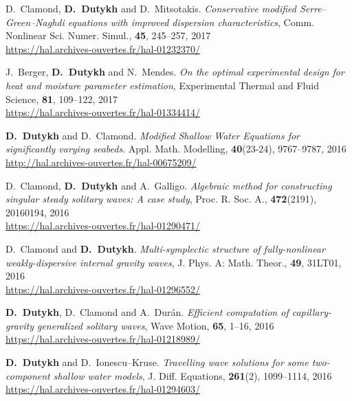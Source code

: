 \begin{etaremune}
  \item D.~Clamond, \textbf{D.~Dutykh} and D.~Mitsotakis. \textit{Conservative modified Serre--Green--Naghdi equations with improved dispersion characteristics}, Comm. Nonlinear Sci. Numer. Simul., \textbf{45}, 245--257, 2017 \\ %
  \url{https://hal.archives-ouvertes.fr/hal-01232370/}

  \item J.~Berger, \textbf{D.~Dutykh} and N.~Mendes. \textit{On the optimal experimental design for heat and moisture parameter estimation}, Experimental Thermal and Fluid Science, \textbf{81}, 109--122, 2017 \\ %
  \url{https://hal.archives-ouvertes.fr/hal-01334414/}
  

  \item \textbf{D.~Dutykh} and D.~Clamond. \textit{Modified Shallow Water Equations for significantly varying seabeds}. Appl. Math. Modelling, \textbf{40}(23-24), 9767--9787, 2016 \\ %
  \url{http://hal.archives-ouvertes.fr/hal-00675209/}

  \item D.~Clamond, \textbf{D.~Dutykh} and A.~Galligo. \textit{Algebraic method for constructing singular steady solitary waves: A case study}, Proc. R. Soc. A., \textbf{472}(2191), 20160194, 2016 \\ %
  \url{https://hal.archives-ouvertes.fr/hal-01290471/}
  
  \item D.~Clamond and \textbf{D.~Dutykh}. \textit{Multi-symplectic structure of fully-nonlinear weakly-dispersive internal gravity waves}, J. Phys. A: Math. Theor., \textbf{49}, 31LT01, 2016 \\ %
  \url{https://hal.archives-ouvertes.fr/hal-01296552/}

  \item \textbf{D.~Dutykh}, D.~Clamond and A.~Dur\'an. \textit{Efficient computation of capillary-gravity generalized solitary waves}, Wave Motion, \textbf{65}, 1--16, 2016 \\ %
  \url{https://hal.archives-ouvertes.fr/hal-01218989/}
  
  \item \textbf{D.~Dutykh} and D.~Ionescu--Kruse. \textit{Travelling wave solutions for some two-component shallow water models}, J. Diff. Equations, \textbf{261}(2), 1099--1114, 2016 \\ %
  \url{https://hal.archives-ouvertes.fr/hal-01294603/}
  

\end{etaremune}
